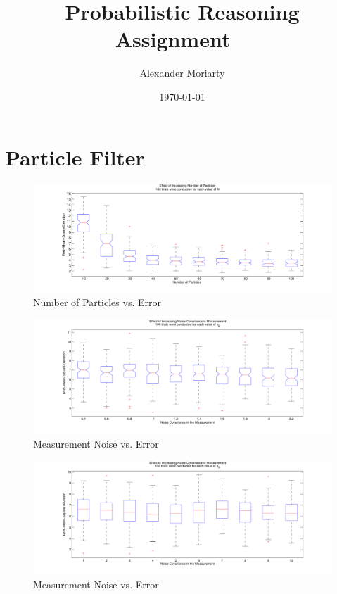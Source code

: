 \documentclass[	DIV=calc,%
				paper=a4,%
				fontsize=11pt,%
				twocolumn]{article}	 %
\title{Probabilistic Reasoning
\\ Assignment ~\upperRomannumeral{8}}%
\author{Alexander Moriarty }	%
\date{\today}
\begin{document}
\maketitle
\thispagestyle{fancy} %


\section{Particle Filter}
\begin{figure}[h]
  \centering
  \caption{Number of Particles vs. Error}
  \includegraphics[width=\textwidth]{./100_trials_for_each_value_of_N}
\end{figure}

\begin{figure}[h]
  \centering
  \caption{Measurement Noise vs. Error}
  \includegraphics[width=\textwidth]{./100_trials_for_each_value_of_xR}
\end{figure}

\begin{figure}[h]
  \centering
  \caption{Measurement Noise vs. Error}
  \includegraphics[width=\textwidth]{./100_trials_for_each_new_value_of_xR}
\end{figure}
\end{document}
